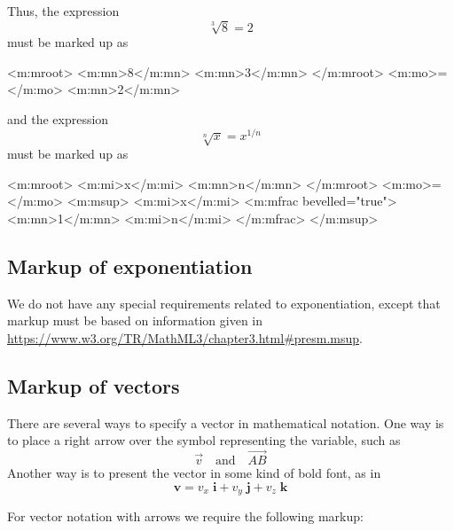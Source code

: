 \documentclass[english,a4paper,11pt]{article}
\begin{document}
Thus, the expression \begin{equation}\sqrt[3]{8} =2\end{equation}
must be marked up as
\begin{kodeblokk}
\begin{verbatimtab}[3]
<m:mroot>
	<m:mn>8</m:mn>
	<m:mn>3</m:mn>
</m:mroot>
<m:mo>=</m:mo>
<m:mn>2</m:mn>
\end{verbatimtab}
\end{kodeblokk}
and the expression \begin{equation}\sqrt[n]{x}=x^{1/n} \end{equation}
must be marked up as
\begin{kodeblokk}
\begin{verbatimtab}[3]
<m:mroot>
	<m:mi>x</m:mi>
	<m:mn>n</m:mn>
</m:mroot>
<m:mo>=</m:mo>
<m:msup>
	<m:mi>x</m:mi>
	<m:mfrac bevelled="true">
		<m:mn>1</m:mn>
		<m:mi>n</m:mi>
	</m:mfrac>
</m:msup>
\end{verbatimtab}
\end{kodeblokk}

\subsection{Markup of exponentiation}
We do not have any special requirements related to exponentiation, except that markup must be based on information given in \url{https://www.w3.org/TR/MathML3/chapter3.html#presm.msup}.

\subsection{Markup of vectors}
There are several ways to specify a vector in mathematical notation. One way is to place a right arrow over the symbol representing the variable, such as 
\begin{equation}
\vec{v}\quad \text{and}\quad \overrightarrow{AB}
\end{equation}
Another way is to present the vector in some kind of bold font, as in 
\begin{equation}
\mathbf{v} = v_x\;  \mathbf{i} + v_y\; \mathbf{j} + v_z\;  \mathbf{k}
\end{equation}

\bigskip
For vector notation with arrows we require the following markup:
\begin{kodeblokk}
\end{kodeblokk}
\end{document}
